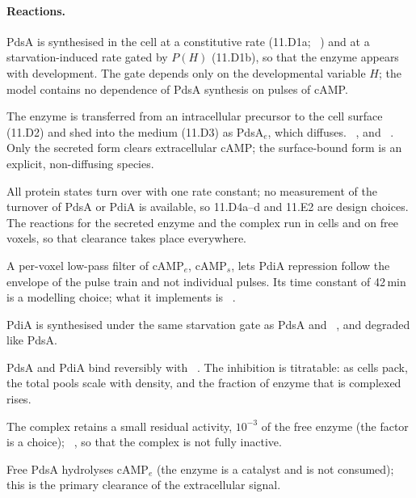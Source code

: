 \paragraph{Reactions.}
\begin{description}\itemsep0pt
\item[11.D1a/b] PdsA is synthesised in the cell at a constitutive rate (11.D1a; ~\cite{sucgang1997}) and at a starvation-induced rate gated by $P(H)$ (11.D1b), so that the enzyme appears with development. The gate depends only on the developmental variable $H$; the model contains no dependence of PdsA synthesis on pulses of cAMP.
\item[11.D2/D3] The enzyme is transferred from an intracellular precursor to the cell surface (11.D2) and shed into the medium (11.D3) as PdsA$_e$, which diffuses. ~\cite{garcia2009}, and ~\cite{bader2007}. Only the secreted form clears extracellular cAMP; the surface-bound form is an explicit, non-diffusing species.
\item[11.D4] All protein states turn over with one rate constant; no measurement of the turnover of PdsA or PdiA is available, so 11.D4a--d and 11.E2 are design choices. The reactions for the secreted enzyme and the complex run in cells and on free voxels, so that clearance takes place everywhere.
\item[11.F1/F2] A per-voxel low-pass filter of cAMP$_e$, cAMP$_s$, lets PdiA repression follow the envelope of the pulse train and not individual pulses. Its time constant of 42\,min is a modelling choice; what it implements is ~\cite{yeh1978}.
\item[11.E1/E2] PdiA is synthesised under the same starvation gate as PdsA and ~\cite{yeh1978}, and degraded like PdsA.
\item[11.E3] PdsA and PdiA bind reversibly with ~\cite{franke1981}. The inhibition is titratable: as cells pack, the total pools scale with density, and the fraction of enzyme that is complexed rises.
\item[11.E4] The complex retains a small residual activity, $10^{-3}$ of the free enzyme (the factor is a choice); ~\cite{franke1981}, so that the complex is not fully inactive.
\item[11.2] Free PdsA hydrolyses cAMP$_e$ (the enzyme is a catalyst and is not consumed); this is the primary clearance of the extracellular signal.
\end{description}

